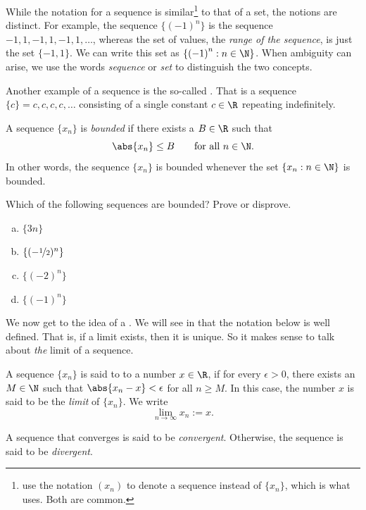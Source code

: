 \documentclass[12pt]{book}
\begin{document}
While the notation for a sequence
is similar\footnote{\cite{BS} use the notation $(x_n)$ to denote
a sequence instead of $\{ x_n \}$, which is what \cite{Rudin:baby} uses.
Both are common.}
to that of a set, the notions are
distinct.
For example, the sequence $\{ {(-1)}^n \}$ is the sequence
$-1,1,-1,1,-1,1,\ldots$, whereas the set of values, the
\emph{range of the sequence},
is just the set $\{ -1, 1 \}$.
We can write this set
as $\{ {(-1)}^n : n \in \N \}$.
When ambiguity can arise, we use the words \emph{sequence} or \emph{set} to distinguish the two concepts.

Another example of a sequence is the so-called \emph{}.
That is a sequence $\{ c \} = c,c,c,c,\ldots$ consisting of a single
constant $c \in \R$ repeating indefinitely.

\begin{defn}
A sequence $\{ x_n \}$ is \emph{bounded} if
there exists a $B \in \R$ such that
\begin{equation*}
\abs{x_n} \leq B \qquad \text{for all $n \in \N$.}
\end{equation*}
In other words, the sequence $\{x_n\}$ is bounded whenever
the set $\{ x_n : n \in \N \}$
is bounded.
\end{defn}

\begin{exercise}
Which of the following sequences are bounded?  
Prove or disprove.
\begin{enumerate}[a)]
 \item $\{ 3n \}$
 \item $\{ (-\nicefrac12)^n \}$
 \item $\{ (-2)^n \}$
 \item $\{ (-1)^n \}$
\end{enumerate}

\end{exercise}



We now get to the idea of a \emph{}.  We will
see in 
that the notation below is well defined.
That is, if a limit exists, then
it is unique.
So it makes sense to talk about \emph{the} limit of a sequence.

\begin{defn}
A sequence $\{ x_n \}$ is said to \emph{} to a number
$x \in \R$, if for every $\epsilon > 0$, there exists an $M \in \N$ such
that $\abs{x_n - x} < \epsilon$ for all $n \geq M$.
In this case, the number $x$ is said to be the \emph{limit} of $\{ x_n \}$.
We write
\begin{equation*}
\lim_{n\to \infty} x_n := x .
\end{equation*}

A sequence that converges is said to be \emph{convergent}.
Otherwise, the sequence is said to be \emph{divergent}.
\end{defn}
\end{document}

